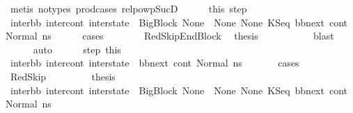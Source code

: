\begin{isabellebody}
\ {\isacharparenleft}{\kern0pt}metis\ {\isacharparenleft}{\kern0pt}no{\isacharunderscore}{\kern0pt}types{\isacharparenright}{\kern0pt}\ prod{\isacharunderscore}{\kern0pt}cases{}\ relpowp{\isacharunderscore}{\kern0pt}Suc{\isacharunderscore}{\kern0pt}D{}{\isacharparenright}{\kern0pt}\isanewline
\ \ \ \ \isamarkupfalse%
\ this\ step{}\ \isamarkupfalse%
\ {\isachardoublequoteopen}{\isacharparenleft}{\kern0pt}inter{\isacharunderscore}{\kern0pt}bb{\isacharcomma}{\kern0pt}\ inter{\isacharunderscore}{\kern0pt}cont{\isacharcomma}{\kern0pt}\ inter{\isacharunderscore}{\kern0pt}state{\isacharparenright}{\kern0pt}\ {\isacharequal}{\kern0pt}\ {\isacharparenleft}{\kern0pt}BigBlock\ None\ {\isacharbrackleft}{\kern0pt}{\isacharbrackright}{\kern0pt}\ None\ None{\isacharcomma}{\kern0pt}\ {\isacharparenleft}{\kern0pt}KSeq\ bb{\isacharunderscore}{\kern0pt}next\ cont{}{\isacharparenright}{\kern0pt}{\isacharcomma}{\kern0pt}\ Normal\ ns{}{\isacharparenright}{\kern0pt}{\isachardoublequoteclose}\isanewline
\ \ \ \ \isamarkupfalse%
\ cases\isanewline
\ \ \ \ \ \ \isamarkupfalse%
\ RedSkipEndBlock\ \isamarkupfalse%
\ {\isacharquery}{\kern0pt}thesis\ \isanewline
\ \ \ \ \ \ \ \ \isamarkupfalse%
\ blast\isanewline
\ \ \ \ \isamarkupfalse%
\ auto\isanewline
\ \ \ \ \isamarkupfalse%
\ step{}\ this\ \isamarkupfalse%
\ {\isachardoublequoteopen}{\isacharparenleft}{\kern0pt}inter{\isacharunderscore}{\kern0pt}bb{}{\isacharcomma}{\kern0pt}\ inter{\isacharunderscore}{\kern0pt}cont{}{\isacharcomma}{\kern0pt}\ inter{\isacharunderscore}{\kern0pt}state{}{\isacharparenright}{\kern0pt}\ {\isacharequal}{\kern0pt}\ {\isacharparenleft}{\kern0pt}bb{\isacharunderscore}{\kern0pt}next{\isacharcomma}{\kern0pt}\ cont{}{\isacharcomma}{\kern0pt}\ Normal\ ns{}{\isacharparenright}{\kern0pt}{\isachardoublequoteclose}\ \isanewline
\ \ \ \ \isamarkupfalse%
\ cases\ \isanewline
\ \ \ \ \ \ \isamarkupfalse%
\ RedSkip\ \isanewline
\ \ \ \ \ \ \isamarkupfalse%
\ {\isacharquery}{\kern0pt}thesis\ \ \isanewline
\ \ \ \ \ \ \ \ \isamarkupfalse%
\ {\isacartoucheopen}{\isacharparenleft}{\kern0pt}inter{\isacharunderscore}{\kern0pt}bb{\isacharcomma}{\kern0pt}\ inter{\isacharunderscore}{\kern0pt}cont{\isacharcomma}{\kern0pt}\ inter{\isacharunderscore}{\kern0pt}state{\isacharparenright}{\kern0pt}\ {\isacharequal}{\kern0pt}\ {\isacharparenleft}{\kern0pt}BigBlock\ None\ {\isacharbrackleft}{\kern0pt}{\isacharbrackright}{\kern0pt}\ None\ None{\isacharcomma}{\kern0pt}\ KSeq\ bb{\isacharunderscore}{\kern0pt}next\ cont{}{\isacharcomma}{\kern0pt}\ Normal\ ns{}{\isacharparenright}{\kern0pt}{\isacartoucheclose}\ \isanewline

\end{isabellebody}
